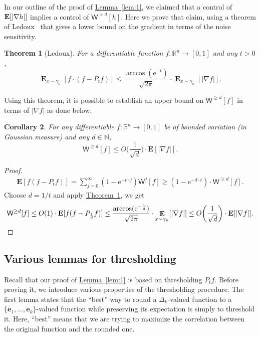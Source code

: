 \documentclass[11pt]{article}
\numberwithin{equation}{section}
\newtheorem{theorem}{Theorem}[section]
\newtheorem{corollary}[theorem]{Corollary}
\theoremstyle{definition}
\theoremstyle{plain}
\newcommand{\eee}{\mathrm e}
\newcommand{\expref}[2]{\hyperref[#2]{#1~\ref{#2}}}
\newcommand{\E}{{\bf E}}
\begin{document}
In our outline of the proof of \expref{Lemma}{lem:1}, we claimed that a control of
$\E[|\nabla h|]$ implies a control of $\mathsf{W}^{> d}[h]$. Here we prove that
claim, using a theorem of Ledoux~\cite{Ledoux:94} that gives a lower bound on
the gradient in terms of the noise sensitivity. 

%
\begin{theorem}[Ledoux]  %
  \label{thm:Ledoux}
    For a differentiable function $f: \mathbb{R}^n \rightarrow [0,1]$ and any $t > 0$,
\[
\mathop{\mathbf{E}}_{x \sim \gamma_n} [f \cdot (f - P_t f)]  \le \frac{\arccos (\eee^{-t})}{\sqrt{2\pi}} \cdot \mathop{\mathbf{E}}_{x \sim \gamma_n}[|\nabla f|]. 
\]
\end{theorem}
Using this theorem, it is possible to establish an upper bound on $\mathsf{W}^{\ge d}[f]$ in terms of $|\nabla f|$ as done below. 
\begin{corollary}\label{corr:gradient}
    For any differentiable $f: \mathbb{R}^n \rightarrow [0,1]$ be of bounded variation (in Gaussian measure) and any $d \in \mathbb{N}$,
\[
\mathsf{W}^{\ge d} [f]  \leq O\bigg( \frac{1}{\sqrt{d}}\bigg) \cdot \mathbf{E}[|\nabla f|].
\]
\end{corollary}
\begin{proof}
\begin{eqnarray*}
\mathbf{E}[ f (f- P_t f)] = \sum_{j=0}^{\infty} (1- \eee^{-t \cdot j}) \mathsf{W}^{j}[f] \ge (1-\eee^{-d \cdot t}) \cdot  \mathsf{W}^{ \ge d}[f].
\end{eqnarray*}
Choose $d=1/t$ and apply \expref{Theorem}{thm:Ledoux}, we get 
\[
\mathsf{W}^{ \ge d}[f] \leq O(1) \cdot \mathbf{E}[ f (f- P_{\frac{1}{d}} f)] \le  \frac{\arccos (\eee^{-\frac1d})}{\sqrt{2\pi}} \cdot \mathop{\mathbf{E}}_{x \sim \gamma_n}[|\nabla f|] \le O\bigg( \frac{1}{\sqrt{d}}\bigg) \cdot \mathbf{E}[|\nabla f|].\qedhere
\]
\end{proof}

\subsection{Various lemmas for thresholding}

Recall that our proof of \expref{Lemma}{lem:1} is based on thresholding $P_t f$. Before proving it, we
introduce various properties of the thresholding procedure.
The first lemma states that the ``best'' way to round a $\Delta_k$-valued function to
a $\{\mathbf{e}_1, \dots, \mathbf{e}_k\}$-valued function while preserving its expectation is simply to threshold it.
Here, ``best'' means that we are trying to maximize the correlation between the original function
and the rounded one.
\end{document}
